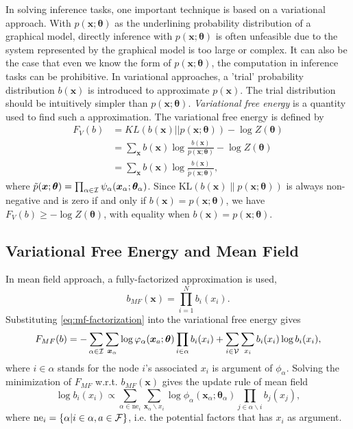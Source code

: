 In solving inference tasks, one important technique is based on a variational approach. With $p(\bm{x};\bm{\theta})$ as the underlining probability distribution of a graphical model, directly inference with $p(\bm{x}; \bm{\theta})$ is often unfeasible due to the system represented by the graphical model is too large or complex. It can also be the case that even we know the form of $p(\bm{x}; \bm{\theta})$, the computation in inference tasks can be prohibitive. In variational approaches, a 'trial' probability distribution $b(\bm{x})$ is introduced to approximate $p(\bm{x})$. The trial distribution should be intuitively simpler than $p(\bm{x}; \bm{\theta})$. \textit{Variational free energy} \cite{opper2001advanced} is a quantity used to find such a approximation. The variational free energy is defined by
\begin{align}
  F_V(b) & = KL(b( \bm{x}) || p(\bm{x}; \bm{\theta})) - \log{Z(\bm{\theta})} \nonumber \\
         &= \sum_{\bm{x}}b(\bm{x}) \log{\frac{b(\bm{x})}{{p}(\bm{x}; \bm{\theta})}} - \log{Z(\bm{\theta})} \nonumber \\
         & = \sum_{\bm{x}}b(\bm{x}) \log{\frac{b(\bm{x})}{\tilde{p}(\bm{x}; \bm{\theta})}},
\end{align}
where $\tilde{p}(\bm{x}; \bm{\theta}) =  \prod_{\alpha \in \mathcal{I}} \psi_{\alpha}(\bm{x}_{\alpha}; \bm{\theta}_{\alpha})$. Since $\mathrm{KL}(b(\bm{x})\|p(\bm{x};\bm{\theta}))$ is always non-negative and is zero if and only if $b(\bm{x}) = p(\bm{x};\bm{\theta})$, we have $F_V(b) \geq - \log{Z(\bm{\theta})}$, with equality when $b(\bm{x}) = p(\bm{x};\bm{\theta})$.

\subsection{Variational Free Energy and Mean Field}

In mean field approach, a fully-factorized approximation is used,
\begin{equation}\label{eq:mf-factorization}
  b_{MF}(\bm{x}) = \prod_{i=1}^{N}b_i(x_i).
\end{equation}
Substituting \eqref{eq:mf-factorization} into the variational free energy gives
\begin{align}
  F_{MF}(b) =  - \sum_{\alpha \in \mathcal{I}}\sum_{\bm{x}_{\alpha}} \log{\varphi_{\alpha}(\bm{x}_{a};\bm{\theta})}
             \prod_{i\in \alpha}b_i(x_i) + \sum_{i \in \mathcal{V}} \sum_{x_i} b_i(x_i) \log{b_i(x_i)},
\end{align}
where $i \in \alpha$ stands for the node $i$'s associated $x_i$ is argument of $\phi_{\alpha}$.
Solving the minimization of $F_{MF}$ w.r.t. $b_{MF}(\bm{x})$ gives the
update rule of mean field
\begin{equation}
  \log{b_i(x_i)} \propto \sum_{\alpha \in \mathrm{ne}_i} \sum_{\bm{x}_{\alpha} \backslash x_i} \log{\phi_{\alpha}}(\bm{x}_{\alpha};\bm{\theta}_{\alpha}) \prod_{j\in {\alpha}\backslash i} b_j(x_j),
\end{equation}
where $\mathrm{ne}_i = \left\{ \alpha | i \in \alpha, a \in \mathcal{F} \right\}$, i.e. the
potential factors that has $x_i$ as argument.

